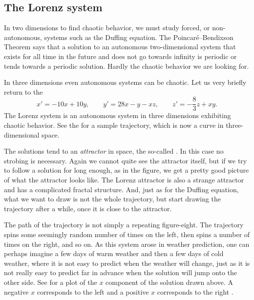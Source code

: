 \subsection{The Lorenz system}

In two dimensions to find chaotic behavior,
we must study forced, or non-autonomous, systems such as the Duffing
equation.
The Poincar\'e--Bendixson Theorem says that
a solution to an autonomous
two-dimensional system that exists for all time in the future
and does not go towards infinity
is periodic or tends towards a periodic solution.  Hardly the chaotic
behavior we are looking for.

In three dimensions even autonomous systems can be chaotic.
Let us very briefly return to the 
\begin{equation*}
x' = -10x +10y, \qquad y' = 28x-y-xz, \qquad z'=-\frac{8}{3}z + xy .
\end{equation*}
The Lorenz system is an autonomous system in three dimensions
exhibiting chaotic behavior.
See the  for a sample trajectory,
which is now a curve in three-dimensional space.
\begin{myfig}
\capstart
{}
\caption{A trajectory in the Lorenz system. \label{nlin:lorenz}}
\end{myfig}

The solutions tend to an \emph{attractor} in space,
the so-called \emph{}.
In this case no strobing is
necessary.
Again we cannot quite see the attractor itself, but if we try to follow a solution
for long enough, as in the figure,
we get a pretty good picture of what the attractor looks
like.
The Lorenz attractor is also a strange attractor and has a complicated
fractal structure.  And, just as for the Duffing equation, what we want to
draw is not the whole trajectory, but start drawing the trajectory after a
while, once it is close to the attractor.

The path of the trajectory is not simply a repeating figure-eight.
The trajectory spins some
seemingly random number of times on the left, then spins a number of times on
the right, and so on.  As this system arose in weather prediction, one can
perhaps imagine a few days of warm weather and then a few days of cold
weather, where it is not easy to predict when the weather will change,
just as it is not really easy to predict far in advance when the solution
will jump onto the other side.  See  for a
plot of the $x$ component of the solution drawn above.  A negative $x$
corresponds to the left  and a positive $x$
corresponds to the right .

